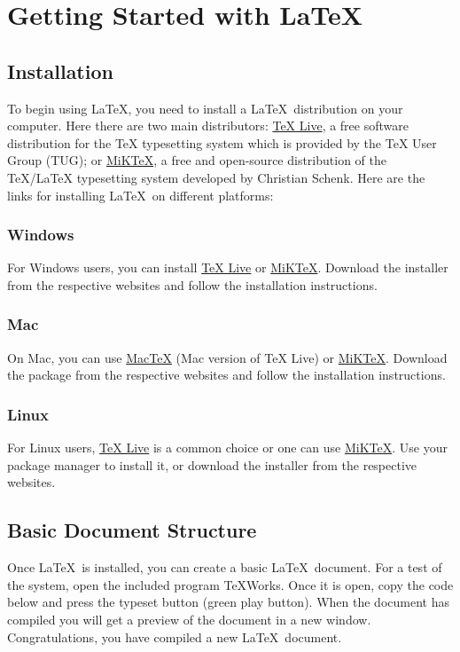 \chapter{Getting Started with \LaTeX}\label{ch:gettingstarted}
	\section{Installation}
		To begin using \LaTeX, you need to install a \LaTeX\ distribution on your computer.
		Here there are two main distributors: \href{https://tug.org/texlive}{TeX Live}, a free software distribution for the TeX typesetting system which is provided by the TeX User Group (TUG); or \href{https://miktex.org/}{MiKTeX}, a free and open-source distribution of the TeX/LaTeX typesetting system developed by Christian Schenk.
		Here are the links for installing \LaTeX\ on different platforms:

		\subsection{Windows}
			For Windows users, you can install \href{https://tug.org/texlive/windows.html}{TeX Live} or \href{https://miktex.org/download}{MiKTeX}. 
			Download the installer from the respective websites and follow the installation instructions.

		\subsection{Mac}
			On Mac, you can use \href{https://tug.org/mactex/}{MacTeX} (Mac version of TeX Live) or \href{https://miktex.org/download}{MiKTeX}. 
			Download the package from the respective websites and follow the installation instructions.

		\subsection{Linux}
			For Linux users, \href{https://tug.org/texlive/quickinstall.html}{TeX Live} is a common choice or one can use \href{https://miktex.org/download}{MiKTeX}. 
			Use your package manager to install it, or download the installer from the respective websites.

	\section{Basic Document Structure}
		Once \LaTeX\ is installed, you can create a basic \LaTeX\ document.
		For a test of the system, open the included program TeXWorks.
		Once it is open, copy the code below and press the typeset button (green play button).
		When the document has compiled you will get a preview of the document in a new window.
		Congratulations, you have compiled a new \LaTeX\ document.


